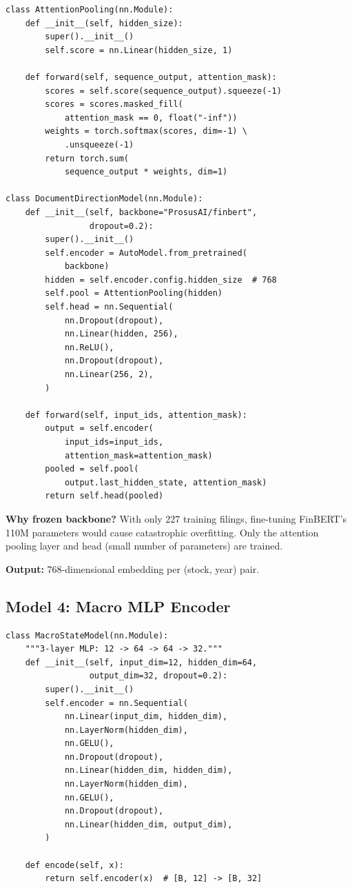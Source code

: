 \begin{lstlisting}[caption={FinBERT with attention pooling (src/models/document\_model.py)}]
class AttentionPooling(nn.Module):
    def __init__(self, hidden_size):
        super().__init__()
        self.score = nn.Linear(hidden_size, 1)

    def forward(self, sequence_output, attention_mask):
        scores = self.score(sequence_output).squeeze(-1)
        scores = scores.masked_fill(
            attention_mask == 0, float("-inf"))
        weights = torch.softmax(scores, dim=-1) \
            .unsqueeze(-1)
        return torch.sum(
            sequence_output * weights, dim=1)

class DocumentDirectionModel(nn.Module):
    def __init__(self, backbone="ProsusAI/finbert",
                 dropout=0.2):
        super().__init__()
        self.encoder = AutoModel.from_pretrained(
            backbone)
        hidden = self.encoder.config.hidden_size  # 768
        self.pool = AttentionPooling(hidden)
        self.head = nn.Sequential(
            nn.Dropout(dropout),
            nn.Linear(hidden, 256),
            nn.ReLU(),
            nn.Dropout(dropout),
            nn.Linear(256, 2),
        )

    def forward(self, input_ids, attention_mask):
        output = self.encoder(
            input_ids=input_ids,
            attention_mask=attention_mask)
        pooled = self.pool(
            output.last_hidden_state, attention_mask)
        return self.head(pooled)
\end{lstlisting}

\textbf{Why frozen backbone?} With only 227 training filings, fine-tuning FinBERT's 110M parameters would cause catastrophic overfitting. Only the attention pooling layer and head (small number of parameters) are trained.

\textbf{Output:} 768-dimensional embedding per (stock, year) pair.

\subsection{Model 4: Macro MLP Encoder}

\begin{lstlisting}[caption={Macro feature encoder (src/models/macro\_model.py)}]
class MacroStateModel(nn.Module):
    """3-layer MLP: 12 -> 64 -> 64 -> 32."""
    def __init__(self, input_dim=12, hidden_dim=64,
                 output_dim=32, dropout=0.2):
        super().__init__()
        self.encoder = nn.Sequential(
            nn.Linear(input_dim, hidden_dim),
            nn.LayerNorm(hidden_dim),
            nn.GELU(),
            nn.Dropout(dropout),
            nn.Linear(hidden_dim, hidden_dim),
            nn.LayerNorm(hidden_dim),
            nn.GELU(),
            nn.Dropout(dropout),
            nn.Linear(hidden_dim, output_dim),
        )

    def encode(self, x):
        return self.encoder(x)  # [B, 12] -> [B, 32]
\end{lstlisting}

